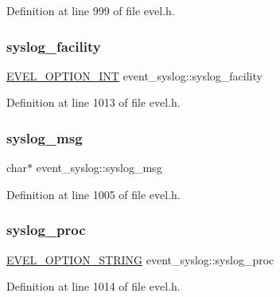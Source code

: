 Definition at line 999 of file evel.\+h.

\hypertarget{structevent__syslog_a9fb37e74aebac50216f92ee162ea1ce0}{}\label{structevent__syslog_a9fb37e74aebac50216f92ee162ea1ce0} 
\subsubsection{\texorpdfstring{syslog\+\_\+facility}{syslog\_facility}}
{\footnotesize\ttfamily \hyperlink{evel_8h_a452d825778d1c2368a54b8f689a25ba7}{E\+V\+E\+L\+\_\+\+O\+P\+T\+I\+O\+N\+\_\+\+I\+NT} event\+\_\+syslog\+::syslog\+\_\+facility}



Definition at line 1013 of file evel.\+h.

\hypertarget{structevent__syslog_a39eea73cdc0e3cb943984a3d3512b60f}{}\label{structevent__syslog_a39eea73cdc0e3cb943984a3d3512b60f} 
\subsubsection{\texorpdfstring{syslog\+\_\+msg}{syslog\_msg}}
{\footnotesize\ttfamily char$\ast$ event\+\_\+syslog\+::syslog\+\_\+msg}



Definition at line 1005 of file evel.\+h.

\hypertarget{structevent__syslog_a6a947760f13659ef7c19d0cc8b5dc315}{}\label{structevent__syslog_a6a947760f13659ef7c19d0cc8b5dc315} 
\subsubsection{\texorpdfstring{syslog\+\_\+proc}{syslog\_proc}}
{\footnotesize\ttfamily \hyperlink{evel_8h_a0de5113a7b72de93c0c7b644f7ea7ec3}{E\+V\+E\+L\+\_\+\+O\+P\+T\+I\+O\+N\+\_\+\+S\+T\+R\+I\+NG} event\+\_\+syslog\+::syslog\+\_\+proc}



Definition at line 1014 of file evel.\+h.

\hypertarget{structevent__syslog_a92b4ef63a8eea577abf3d3b8eb9dc5fc}{}\label{structevent__syslog_a92b4ef63a8eea577abf3d3b8eb9dc5fc} 
